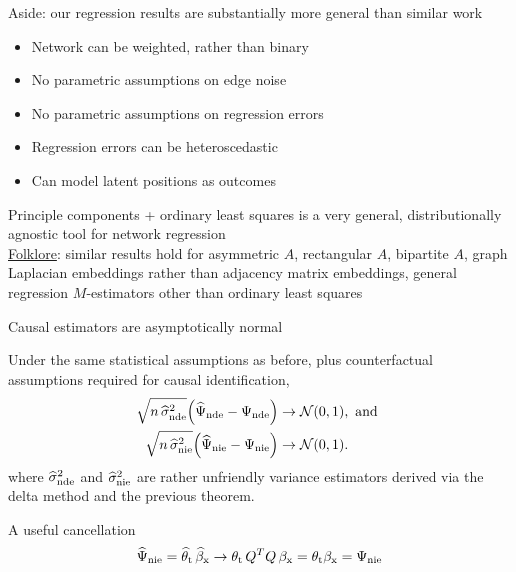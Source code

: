 \documentclass[aspectratio=169]{beamer}
\theoremstyle{remark}
\begin{document}
\begin{frame}{Aside: our regression results are substantially more general than similar work}
    \begin{itemize}
        \item Network can be weighted, rather than binary
        \item No parametric assumptions on edge noise
        \item No parametric assumptions on regression errors
        \item Regression errors can be heteroscedastic
        \item Can model latent positions as outcomes
    \end{itemize}
    Principle components + ordinary least squares is a very general, distributionally agnostic tool for network regression \\
    \vspace{2mm}
    \underline{Folklore}: similar results hold for asymmetric $A$, rectangular $A$, bipartite $A$, graph Laplacian embeddings rather than adjacency matrix embeddings, general regression $M$-estimators other than ordinary least squares
\end{frame}

\begin{frame}{Causal estimators are asymptotically normal}
    \vspace{2mm}
    \begin{theorem}
        Under the same statistical assumptions as before, plus counterfactual assumptions required for causal identification,
        \begin{align*}
            \sqrt{n \, \sigmahatnde} \paren*{\ndehat - \nde}
             & \to
            \Normal{0}{1}, \text { and } \\
            \sqrt{n \, \sigmahatnie} \paren*{\niehat - \nie}
             & \to
            \Normal{0}{1}.
        \end{align*}
        \noindent where $\widehat{\sigma}^2_\mathrm{nde}$ and $\widehat{\sigma}^2_\mathrm{nie}$ are rather unfriendly variance estimators derived via the delta method and the previous theorem.
    \end{theorem}

    \begin{block}{A useful cancellation}
        \begin{equation*}
            \widehat{\Psi}_\mathrm{nie} = \widehat{\theta}_\text{t} \, \widehat{\beta}_\text{x} \to \theta_\text{t} \, Q^T Q \, \beta_\text{x} = \theta_\text{t} \beta_\text{x} = \Psi_\mathrm{nie}
        \end{equation*}
    \end{block}
\end{frame}
\end{document}
